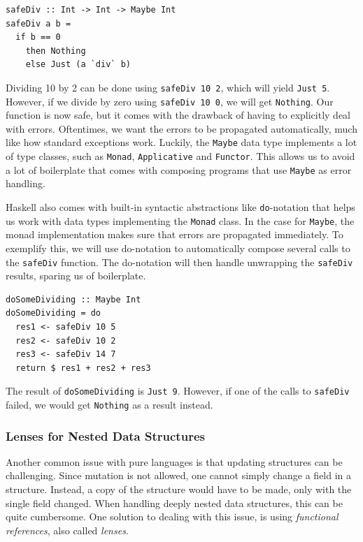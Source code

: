 \documentclass[a4paper,english]{ifimaster}
\begin{document}
\begin{verbatim}
safeDiv :: Int -> Int -> Maybe Int
safeDiv a b =
  if b == 0
    then Nothing
    else Just (a `div` b)
\end{verbatim}

Dividing 10 by 2 can be done using \texttt{safeDiv 10 2}, which will yield \texttt{Just 5}. However, if we divide by zero using \texttt{safeDiv 10 0}, we will get \texttt{Nothing}. Our function is now safe, but it comes with  the drawback of having to explicitly deal with errors. Oftentimes, we want the errors to be propagated automatically, much like how standard exceptions work. Luckily, the \texttt{Maybe} data type implements a lot of type classes, such as \texttt{Monad}, \texttt{Applicative} and \texttt{Functor}. This allows us to avoid a lot of boilerplate that comes with composing programs that use \texttt{Maybe} as error handling.

Haskell also comes with built-in syntactic abstractions like \texttt{do}-notation that helps us work with data types implementing the \texttt{Monad} class. In the case for \texttt{Maybe}, the monad implementation makes sure that errors are propagated immediately. To exemplify this, we will use do-notation to automatically compose several calls to the \texttt{safeDiv} function. The do-notation will then handle unwrapping the \texttt{safeDiv} results, sparing us of boilerplate.

\begin{verbatim}
doSomeDividing :: Maybe Int
doSomeDividing = do
  res1 <- safeDiv 10 5
  res2 <- safeDiv 10 2
  res3 <- safeDiv 14 7
  return $ res1 + res2 + res3
\end{verbatim}

The result of \texttt{doSomeDividing} is \texttt{Just 9}. However, if one of the calls to \texttt{safeDiv} failed, we would get \texttt{Nothing} as a result instead.

\subsubsection{Lenses for Nested Data Structures}%
\label{ssub:optics_for_nested_data_structures}

Another common issue with pure languages is that updating structures can be challenging. Since mutation is not allowed, one cannot simply change a field in a structure. Instead, a copy of the structure would have to be made, only with the single field changed. When handling deeply nested data structures, this can be quite cumbersome. One solution to dealing with this issue, is using \textit{functional references}, also called \textit{lenses}.
\end{document}
